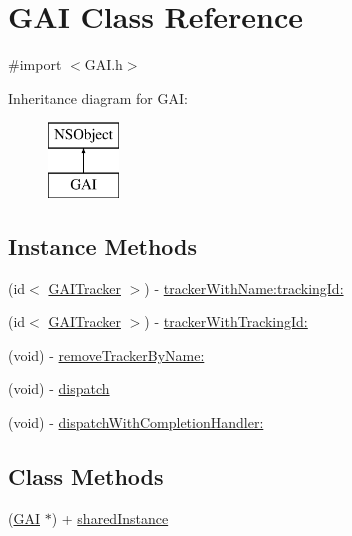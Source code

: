 \hypertarget{interface_g_a_i}{}\section{G\+AI Class Reference}
\label{interface_g_a_i}


{\ttfamily \#import $<$G\+A\+I.\+h$>$}

Inheritance diagram for G\+AI\+:\begin{figure}[H]
\begin{center}
\leavevmode
\includegraphics[height=2.000000cm]{interface_g_a_i}
\end{center}
\end{figure}
\subsection*{Instance Methods}
\begin{DoxyCompactItemize}
\item 
(id$<$ \hyperlink{protocol_g_a_i_tracker-p}{G\+A\+I\+Tracker} $>$) -\/ \hyperlink{interface_g_a_i_a44db9f9fe6a63c95be683ff11813c781}{tracker\+With\+Name\+:tracking\+Id\+:}
\item 
(id$<$ \hyperlink{protocol_g_a_i_tracker-p}{G\+A\+I\+Tracker} $>$) -\/ \hyperlink{interface_g_a_i_a618ed07fef9f41c6cd33d17debec402c}{tracker\+With\+Tracking\+Id\+:}
\item 
(void) -\/ \hyperlink{interface_g_a_i_a6fa05df65911abbdeb4bb7d70389cf99}{remove\+Tracker\+By\+Name\+:}
\item 
(void) -\/ \hyperlink{interface_g_a_i_ad4e8b6ff89df5bc200f2f6aa1877159c}{dispatch}
\item 
(void) -\/ \hyperlink{interface_g_a_i_a5ca71a28925068e89dd5b3e3c5433500}{dispatch\+With\+Completion\+Handler\+:}
\end{DoxyCompactItemize}
\subsection*{Class Methods}
\begin{DoxyCompactItemize}
\item 
(\hyperlink{interface_g_a_i}{G\+AI} $\ast$) + \hyperlink{interface_g_a_i_ac150ba078bd1eaf36f9c0652890814f2}{shared\+Instance}
\end{DoxyCompactItemize}
